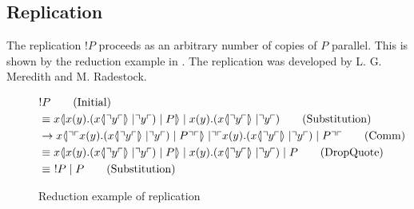 \subsection{Replication}
The replication $!P$ proceeds as an arbitrary number of copies of $P$ parallel. This is shown by the reduction example in . The replication was developed by L. G. Meredith and M. Radestock\citep{Meredith2005}.






\begin{figure}[h]
    \begin{align}
        &!P \tag{Initial} \\
        &\equiv \lift{x}{\inp{x}{y}(\lift{x}{\drop{y}}\para\drop{y})\para P}\para\inp{x}{y}(\lift{x}{\drop{y}}\para \drop{y}) \tag{Substitution} \\
        &\ra \lift{x}{\drop{\quot{\inp{x}{y}(\lift{x}{\drop{y}}\para\drop{y})\para P}}}\para\drop{\quot{\inp{x}{y}(\lift{x}{\drop{y}}\para\drop{y})\para P}} \tag{Comm}\\
        &\equiv \lift{x}{\inp{x}{y}(\lift{x}{\drop{y}}\para\drop{y})\para P}\para\inp{x}{y}(\lift{x}{\drop{y}}\para \drop{y})\para P \tag{DropQuote} \\
        &\equiv\ 
        !P\para P \tag{Substitution}
    \end{align}
    \caption{Reduction example of replication}
    \label{fig:reductionexample}
\end{figure}

\FloatBarrier